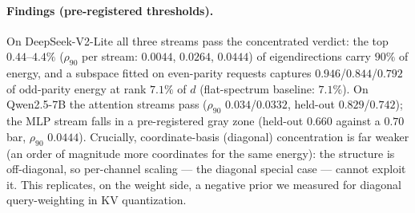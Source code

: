 \documentclass[11pt]{article}
\renewcommand{\_}{\WCorigunderscore\allowbreak}
\begin{document}
\paragraph{Findings (pre-registered thresholds).} On DeepSeek-V2-Lite
all three streams pass the concentrated verdict: the top
$0.44$--$4.4\%$ ($\rho_{90}$ per stream: $0.0044$, $0.0264$, $0.0444$) of eigendirections carry $90\%$ of energy,
and a subspace fitted on even-parity requests captures
$0.946$/$0.844$/$0.792$ of odd-parity energy at rank $7.1\%$ of
$d$ (flat-spectrum baseline: $7.1\%$). On Qwen2.5-7B the attention
streams pass ($\rho_{90}$ $0.034$/$0.0332$, held-out $0.829$/$0.742$); the MLP stream falls
in a pre-registered gray zone (held-out $0.660$ against a $0.70$ bar, $\rho_{90}$ $0.0444$). Crucially, coordinate-basis (diagonal) concentration is far
weaker (an order of magnitude more coordinates for the same energy): the structure is off-diagonal, so
per-channel scaling --- the diagonal special case --- cannot exploit
it. This replicates, on the weight side, a negative prior we measured
for diagonal query-weighting in KV quantization.
\end{document}
